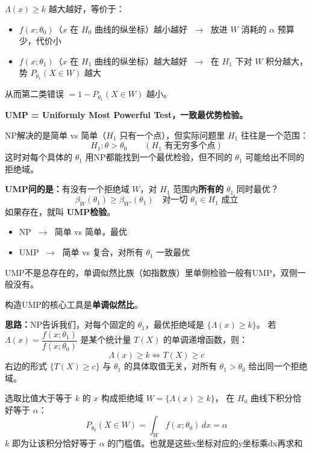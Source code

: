 \begin{dxtips}
   $\Lambda(x) \geq k$ 越大越好，等价于：
\begin{itemize}
    \item $f(x;\theta_0)$（$x$ 在 $H_0$ 曲线的纵坐标）越小越好
    $\;\to\;$ 放进 $W$ 消耗的 $\alpha$ 预算少，代价小
    \item $f(x;\theta_1)$（$x$ 在 $H_1$ 曲线的纵坐标）越大越好
    $\;\to\;$ 在 $H_1$ 下对 $W$ 积分越大，势 $P_{\theta_1}(X \in W)$ 越大
\end{itemize}
从而第二类错误 $= 1 - P_{\theta_1}(X \in W)$ 越小。
\end{dxtips}
\begin{note}
\textbf{UMP = Uniformly Most Powerful Test，一致最优势检验。}

NP解决的是简单 vs 简单（$H_1$ 只有一个点），但实际问题里 $H_1$ 往往是一个范围：
\[
H_1: \theta > \theta_0 \qquad (H_1 \text{ 有无穷多个点})
\]
这时对每个具体的 $\theta_1$ 用NP都能找到一个最优检验，但不同的 $\theta_1$ 可能给出不同的拒绝域。

\textbf{UMP问的是：}有没有一个拒绝域 $W$，对 $H_1$ 范围内\textbf{所有的} $\theta_1$ 同时最优？
\[
\beta_W(\theta_1) \geq \beta_{W'}(\theta_1) \quad \text{对一切 } \theta_1 \in H_1 \text{ 成立}
\]
如果存在，就叫 \textbf{UMP检验}。

\begin{itemize}
    \item NP $\;\to\;$ 简单 vs 简单，最优
    \item UMP $\;\to\;$ 简单 vs 复合，对所有 $\theta_1$ 一致最优
\end{itemize}
UMP不是总存在的，单调似然比族（如指数族）里单侧检验一般有UMP，双侧一般没有。
\end{note}
\begin{note}
构造UMP的核心工具是\textbf{单调似然比}。

\textbf{思路：}NP告诉我们，对每个固定的 $\theta_1$，最优拒绝域是 $\{\Lambda(x) \geq k\}$。
若 $\Lambda(x) = \dfrac{f(x;\theta_1)}{f(x;\theta_0)}$ 是某个统计量 $T(X)$ 的单调递增函数，则：
\[
\Lambda(x) \geq k \iff T(X) \geq c
\]
右边的形式 $\{T(X) \geq c\}$ 与 $\theta_1$ 的具体取值无关，对所有 $\theta_1 > \theta_0$ 给出同一个拒绝域。


\end{note}
\begin{dxtips}
选取比值大于等于 $k$ 的 $x$ 构成拒绝域 $W = \{\Lambda(x) \geq k\}$，
在 $H_0$ 曲线下积分恰好等于 $\alpha$：
\[
P_{\theta_0}(X \in W) = \int_W f(x;\theta_0)\, dx = \alpha
\]
$k$ 即为让该积分恰好等于 $\alpha$ 的门槛值。也就是这些x坐标对应的y坐标乘dx再求和
\end{dxtips}
